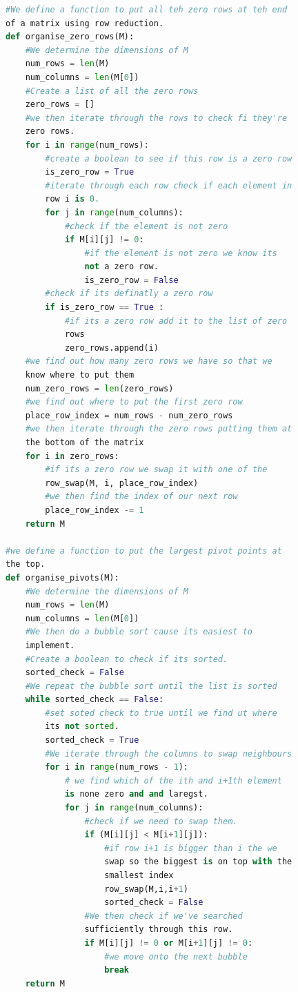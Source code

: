 \documentclass{article}
\begin{document}
\begin{lstlisting}[language=Python, caption=Functions In Linear Algebra, label=fuctions]
#We define a function to put all teh zero rows at teh end 
of a matrix using row reduction.
def organise_zero_rows(M):
    #We determine the dimensions of M
    num_rows = len(M)
    num_columns = len(M[0])
    #Create a list of all the zero rows
    zero_rows = []
    #we then iterate through the rows to check fi they're 
    zero rows.
    for i in range(num_rows):
        #create a boolean to see if this row is a zero row
        is_zero_row = True
        #iterate through each row check if each element in 
        row i is 0.
        for j in range(num_columns):
            #check if the element is not zero
            if M[i][j] != 0:
                #if the element is not zero we know its 
                not a zero row.
                is_zero_row = False
        #check if its definatly a zero row
        if is_zero_row == True :
            #if its a zero row add it to the list of zero 
            rows
            zero_rows.append(i)
    #we find out how many zero rows we have so that we 
    know where to put them
    num_zero_rows = len(zero_rows)
    #we find out where to put the first zero row
    place_row_index = num_rows - num_zero_rows
    #we then iterate through the zero rows putting them at 
    the bottom of the matrix
    for i in zero_rows:
        #if its a zero row we swap it with one of the
        row_swap(M, i, place_row_index)
        #we then find the index of our next row
        place_row_index -= 1
    return M

#we define a function to put the largest pivot points at 
the top.
def organise_pivots(M):
    #We determine the dimensions of M
    num_rows = len(M)
    num_columns = len(M[0])
    #We then do a bubble sort cause its easiest to 
    implement.
    #Create a boolean to check if its sorted.
    sorted_check = False
    #We repeat the bubble sort until the list is sorted
    while sorted_check == False:
        #set soted check to true until we find ut where 
        its not sorted.
        sorted_check = True
        #We iterate through the columns to swap neighbours
        for i in range(num_rows - 1):
            # we find which of the ith and i+1th element 
            is none zero and and laregst.
            for j in range(num_columns):
                #check if we need to swap them.
                if (M[i][j] < M[i+1][j]):
                    #if row i+1 is bigger than i the we 
                    swap so the biggest is on top with the 
                    smallest index
                    row_swap(M,i,i+1)
                    sorted_check = False
                #We then check if we've searched 
                sufficiently through this row.
                if M[i][j] != 0 or M[i+1][j] != 0:
                    #we move onto the next bubble
                    break
    return M


\end{lstlisting}
\end{document}
